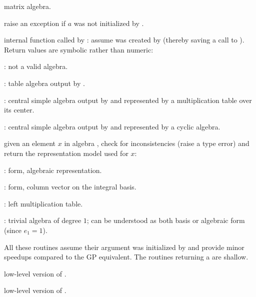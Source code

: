 matrix algebra.


 raise an exception if $a$ was not initialized
by .

 internal function called by : assume
 was created by  (thereby saving a call to ).
Return values are symbolic rather than numeric:

\item {}: not a valid algebra.

\item {}: table algebra output by .

\item {}: central simple algebra output by  and
represented by a multiplication table over its center.

\item {}: central  simple  algebra  output  by  and
represented by a cyclic algebra.

 given an element $x$ in algebra ,
check for inconsistencies (raise a type error) and return the representation
model used for $x$:

\item {}:  form, algebraic representation.

\item {}:  form, column vector on the integral
basis.

\item {}: left multiplication table.

\item {}: trivial algebra of degree $1$; can be understood
as both basis or algebraic form (since $e_1 = 1$).


All these routines assume their argument was initialized by 
and provide minor speedups compared to the GP equivalent. The routines
returning a  are shallow.

 low-level version of .

 low-level version of .

